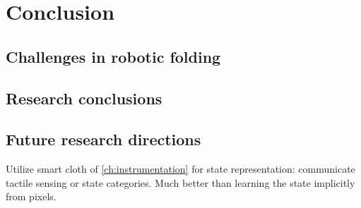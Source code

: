 \documentclass[\home/main.tex]{subfiles}
\begin{document}
\chapter{Conclusion}\label{ch:conclusion}

\section{Challenges in robotic folding}
\section{Research conclusions}
\section{Future research directions}

Utilize smart cloth of \cref{ch:instrumentation} for state representation: communicate tactile sensing or state categories. Much better than learning the state implicitly from pixels. 
\end{document}

